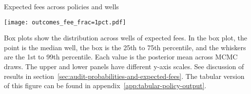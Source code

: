 \caption{Expected fees across policies and wells}

\label{fig:expected-fee-1pct}

\texttt{[image: outcomes\_fee\_frac=1pct.pdf]}

Box plots show the distribution across wells of expected fees.
In the box plot, the point is the median well, the box is the 25th to 75th percentile, and the whiskers are the 1st to 99th percentile.
Each value is the posterior mean across \gls{MCMC} draws.
The upper and lower panels have different y-axis scales.
See discussion of results in section~\ref{sec:audit-probabilities-and-expected-fees}.
The tabular version of this figure can be found in appendix~\ref{app:tabular-policy-output}.
